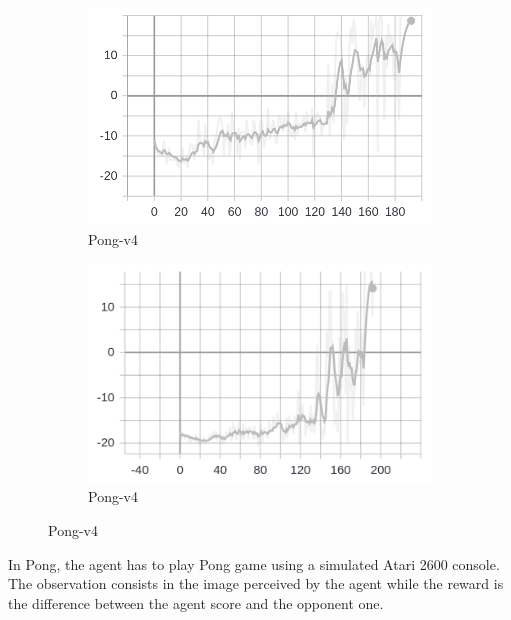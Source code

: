 \documentclass[12pt,a4paper]{article}
\begin{document}
\begin{figure}[H]
    \centering
    \begin{subfigure}[b]{0.3\textwidth}
        \includegraphics[width=\textwidth]{Pong-v4.png}
        \caption{Pong-v4}
        \label{fig:Max Reward}
    \end{subfigure}
    \begin{subfigure}[b]{0.3\textwidth}
        \includegraphics[width=\textwidth]{Pong-v4_mean.png}
        \caption{Pong-v4}
        \label{fig:Mean Reward}
    \end{subfigure}
    \caption{Pong-v4}
    \label{fig:Pong-v4}

\end{figure}

In Pong, the agent has to play Pong game using a simulated Atari 2600 console. The observation consists in the image perceived by the agent while the reward is the difference between the agent score and the opponent one.
\end{document}
